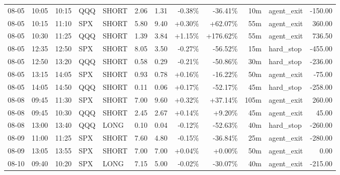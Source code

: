 \documentclass[11pt,a4paper,twoside]{article}
\begin{document}
\begin{center}
\begin{longtable}{>{\color{txtmain}}l l l l l r r r r r >{\color{txtmain}}l r}
08-05 & 10:05 & 10:15 & QQQ & SHORT & 2.06 & 1.31 & \textcolor{lossred}{-0.38\%} & \textcolor{lossred}{-36.41\%} & 10m & agent\_exit & \textcolor{lossred}{-150.00} \\
08-05 & 10:15 & 11:10 & SPX & SHORT & 5.80 & 9.40 & \textcolor{wingreen}{+0.30\%} & \textcolor{wingreen}{+62.07\%} & 55m & agent\_exit & \textcolor{wingreen}{360.00} \\
08-05 & 10:30 & 11:25 & QQQ & SHORT & 1.39 & 3.84 & \textcolor{wingreen}{+1.15\%} & \textcolor{wingreen}{+176.62\%} & 55m & agent\_exit & \textcolor{wingreen}{736.50} \\
08-05 & 12:35 & 12:50 & SPX & SHORT & 8.05 & 3.50 & \textcolor{lossred}{-0.27\%} & \textcolor{lossred}{-56.52\%} & 15m & hard\_stop & \textcolor{lossred}{-455.00} \\
08-05 & 12:50 & 13:20 & QQQ & SHORT & 0.58 & 0.29 & \textcolor{lossred}{-0.21\%} & \textcolor{lossred}{-50.86\%} & 30m & hard\_stop & \textcolor{lossred}{-236.00} \\
08-05 & 13:15 & 14:05 & SPX & SHORT & 0.93 & 0.78 & \textcolor{wingreen}{+0.16\%} & \textcolor{lossred}{-16.22\%} & 50m & agent\_exit & \textcolor{lossred}{-75.00} \\
08-05 & 14:05 & 14:50 & QQQ & SHORT & 0.11 & 0.06 & \textcolor{wingreen}{+0.17\%} & \textcolor{lossred}{-52.17\%} & 45m & hard\_stop & \textcolor{lossred}{-258.00} \\
08-08 & 09:45 & 11:30 & SPX & SHORT & 7.00 & 9.60 & \textcolor{wingreen}{+0.32\%} & \textcolor{wingreen}{+37.14\%} & 105m & agent\_exit & \textcolor{wingreen}{260.00} \\
08-08 & 09:45 & 10:30 & QQQ & SHORT & 2.45 & 2.67 & \textcolor{wingreen}{+0.14\%} & \textcolor{wingreen}{+9.20\%} & 45m & agent\_exit & \textcolor{wingreen}{45.00} \\
08-08 & 13:00 & 13:40 & QQQ & LONG & 0.10 & 0.04 & \textcolor{lossred}{-0.12\%} & \textcolor{lossred}{-52.63\%} & 40m & hard\_stop & \textcolor{lossred}{-260.00} \\
08-09 & 11:00 & 11:25 & SPX & SHORT & 7.60 & 4.80 & \textcolor{lossred}{-0.15\%} & \textcolor{lossred}{-36.84\%} & 25m & agent\_exit & \textcolor{lossred}{-280.00} \\
08-09 & 13:05 & 13:55 & SPX & SHORT & 7.00 & 7.00 & \textcolor{wingreen}{+0.04\%} & \textcolor{wingreen}{+0.00\%} & 50m & agent\_exit & \textcolor{wingreen}{0.00} \\
08-10 & 09:40 & 10:20 & SPX & LONG & 7.15 & 5.00 & \textcolor{lossred}{-0.02\%} & \textcolor{lossred}{-30.07\%} & 40m & agent\_exit & \textcolor{lossred}{-215.00} \\

\end{longtable}
\end{center}
\end{document}
